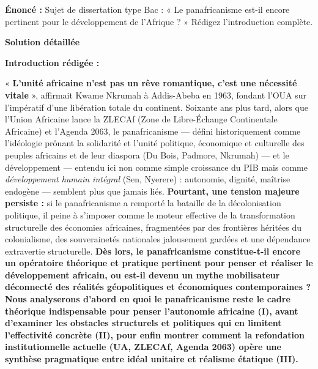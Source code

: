 \documentclass[11pt]{article}
\newcommand{\cle}[1]{{\popxbold\color{popdark}#1}}
\begin{document}
\begin{exoresolu}
\textbf{Énoncé :} Sujet de dissertation type Bac : « Le panafricanisme est-il encore pertinent pour le développement de l'Afrique ? » Rédigez l'introduction complète.

\tcblower
\textbf{Solution détaillée}

\textbf{Introduction rédigée :}

« \textbf{L'unité africaine n'est pas un rêve romantique, c'est une nécessité vitale} », affirmait \cle{Kwame Nkrumah} à Addis-Abeba en 1963, fondant l'OUA sur l'impératif d'une libération totale du continent. Soixante ans plus tard, alors que l'\cle{Union Africaine} lance la \cle{ZLECAf} (Zone de Libre-Échange Continentale Africaine) et l'\cle{Agenda 2063}, le \cle{panafricanisme} — défini historiquement comme l'idéologie prônant la solidarité et l'unité politique, économique et culturelle des peuples africains et de leur diaspora (\cle{Du Bois}, \cle{Padmore}, \cle{Nkrumah}) — et le \cle{développement} — entendu ici non comme simple croissance du PIB mais comme \emph{développement humain intégral} (\cle{Sen}, \cle{Nyerere}) : autonomie, dignité, maîtrise endogène — semblent plus que jamais liés. \textbf{Pourtant, une tension majeure persiste :} si le panafricanisme a remporté la bataille de la décolonisation politique, il peine à s'imposer comme le moteur effective de la transformation structurelle des économies africaines, fragmentées par des frontières héritées du colonialisme, des souverainetés nationales jalousement gardées et une dépendance extravertie structurelle. \textbf{Dès lors, le panafricanisme constitue-t-il encore un opératoire théorique et pratique pertinent pour penser et réaliser le développement africain, ou est-il devenu un mythe mobilisateur déconnecté des réalités géopolitiques et économiques contemporaines ?} \textbf{Nous analyserons d'abord en quoi le panafricanisme reste le cadre théorique indispensable pour penser l'autonomie africaine (I), avant d'examiner les obstacles structurels et politiques qui en limitent l'effectivité concrète (II), pour enfin montrer comment la refondation institutionnelle actuelle (UA, ZLECAf, Agenda 2063) opère une synthèse pragmatique entre idéal unitaire et réalisme étatique (III).}
\end{exoresolu}
\end{document}
